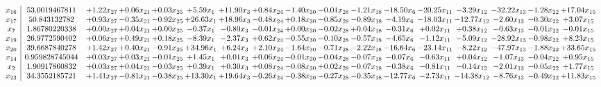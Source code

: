 \documentclass[9pt]{article}
\begin{document}
 \[\begin{array}{c| c c@{\hskip 2pt} c@{\hskip 2pt} c@{\hskip 2pt} c@{\hskip 2pt} c@{\hskip 2pt} c@{\hskip 2pt} c@{\hskip 2pt} c@{\hskip 2pt} c@{\hskip 2pt} c@{\hskip 2pt} c@{\hskip 2pt} c@{\hskip 2pt} c@{\hskip 2pt} c@{\hskip 2pt} c@{\hskip 2pt} }
 x_{16}   &  53.0019467811 & +  1.22 x_{27} & +  0.06 x_{21} & +  0.03 x_{25} & +  5.59 x_{1} & + 11.90 x_{3} & +  0.84 x_{24} & -1.40 x_{30} & -0.01 x_{28} & -1.21 x_{18} & -18.50 x_{6} & -20.25 x_{11} & -3.29 x_{12} & -32.22 x_{13} & -1.28 x_{22} & + 17.04 x_{15}\\
 x_{17}   &  50.843132782 & +  0.93 x_{27} & -0.35 x_{21} & -0.92 x_{25} & + 26.63 x_{1} & + 18.96 x_{3} & -0.48 x_{24} & +  0.18 x_{30} & -0.85 x_{28} & -0.89 x_{18} & -4.19 x_{6} & -18.03 x_{11} & -12.77 x_{12} & -2.60 x_{13} & -0.30 x_{22} & +  3.07 x_{15}\\
 x_{7}   &  1.86780220338 & +  0.00 x_{27} & +  0.04 x_{21} & +  0.00 x_{25} & -0.37 x_{1} & -0.80 x_{3} & -0.01 x_{24} & +  0.00 x_{30} & -0.02 x_{28} & +  0.04 x_{18} & -0.31 x_{6} & +  0.02 x_{11} & +  0.38 x_{12} & -0.63 x_{13} & -0.01 x_{22} & -0.01 x_{15}\\
 x_{19}   &  26.9772590402 & +  0.06 x_{27} & +  0.49 x_{21} & +  0.18 x_{25} & -8.39 x_{1} & -2.37 x_{3} & +  0.62 x_{24} & -0.55 x_{30} & -0.10 x_{28} & -0.57 x_{18} & -4.65 x_{6} & -1.12 x_{11} & -5.09 x_{12} & -28.92 x_{13} & -0.98 x_{22} & +  8.23 x_{15}\\
 x_{20}   &  39.6687840278 & +  1.42 x_{27} & +  0.40 x_{21} & -0.91 x_{25} & + 34.96 x_{1} & +  6.24 x_{3} & +  2.10 x_{24} & -1.64 x_{30} & -0.71 x_{28} & -2.22 x_{18} & -16.64 x_{6} & -23.14 x_{11} & -8.22 x_{12} & -47.97 x_{13} & -1.88 x_{22} & + 33.65 x_{15}\\
 x_{14}   &  0.959828745044 & +  0.03 x_{27} & +  0.03 x_{21} & -0.01 x_{25} & +  1.45 x_{1} & +  0.01 x_{3} & +  0.06 x_{24} & -0.01 x_{30} & -0.04 x_{28} & -0.07 x_{18} & -0.07 x_{6} & -0.63 x_{11} & +  0.04 x_{12} & -1.07 x_{13} & -0.04 x_{22} & +  0.95 x_{15}\\
 x_{2}   &  1.90917860832 & +  0.03 x_{27} & +  0.04 x_{21} & -0.03 x_{25} & +  0.39 x_{1} & +  0.30 x_{3} & +  0.08 x_{24} & -0.08 x_{30} & +  0.02 x_{28} & -0.07 x_{18} & -0.38 x_{6} & -0.81 x_{11} & -0.14 x_{12} & -2.01 x_{13} & -0.05 x_{22} & +  1.77 x_{15}\\
 x_{23}   &  34.3552185721 & +  1.41 x_{27} & -0.81 x_{21} & -0.38 x_{25} & + 13.30 x_{1} & + 19.64 x_{3} & -0.26 x_{24} & -0.38 x_{30} & -0.27 x_{28} & -0.35 x_{18} & -12.77 x_{6} & -2.73 x_{11} & -14.38 x_{12} & -8.76 x_{13} & -0.49 x_{22} & + 11.83 x_{15}\\

\end{array}\]
\end{document}
